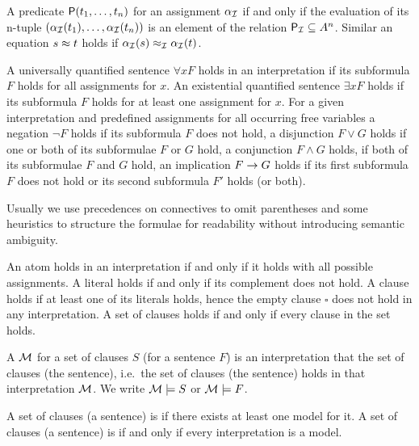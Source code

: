 \begin{definition}\label{def:semantics:atoms}
	A predicate \( \mathsf{P}(t_1,\ldots,t_n) \)
	 for an assignment \( \alpha_{\mathcal{I}} \)
	if and only if the evaluation of its n-tuple \(
	(\alpha_{\mathcal{I}}({t_1}),\ldots,\alpha_{\mathcal{I}}({t_n})) \)
	is an element of the relation \( \mathsf{P}_{\mathcal{I}}\subseteq A^n \).
	Similar an equation \( s\approx t \)
	holds if \( \alpha_{\mathcal{I}}(s) \approx_{\mathcal{I}} \alpha_{\mathcal{I}}(t) \).
\end{definition}

\begin{definition}
	\label{def:semantics:FOF}
	A universally quantified sentence \( \forall x F \)
	holds in an interpretation if its subformula \( F \) holds for all assignments for \( x \).
	An existential quantified sentence \( \exists xF \) holds if its subformula \( F \) holds for at least one assignment for \( x \).
	For a given interpretation and predefined assignments for all occurring free variables
	a negation \( \lnot F \) holds if its subformula \( F \) does not hold,
	a disjunction \( F\lor G \) holds if one or both of its subformulae \( F \) or \( G \) hold,
	a conjunction \( F\land G \) holds, if both of its subformulae \( F \) and \( G \) hold,
	an implication \( F\rightarrow G \) holds if its first subformula \( F \) does not hold or its second subformula \( F' \) holds (or both).

	\begin{remark}Usually we use precedences on connectives to omit parentheses
		and some heuristics to structure the formulae for readability
		without introducing semantic ambiguity.
	\end{remark}
\end{definition}

\begin{definition}\label{def:semantics:CNF}
	An atom holds in an interpretation if and only if it
	holds with all possible assignments.
	A literal holds if and only if its complement does not hold.
	A clause holds if at least one of its literals holds,
	hence the empty clause \( \square \) does not hold in any interpretation.
	A set of clauses holds if and only if every clause in the set holds.
\end{definition}

\begin{definition}
	A  \( \mathcal{M} \) for a set of clauses \( S \) (for a sentence \( F \))
	is an interpretation that
	 the set of clauses (the sentence),
	i.e.~the set of clauses (the sentence) holds in that interpretation \( \mathcal{M} \).
	We write \( \mathcal{M}\models S \) or \( \mathcal{M}\models F \).

	A set of clauses (a sentence) is  if there exists at least one model for it.
	A set of clauses (a sentence) is  if and only if every interpretation is a model.
\end{definition}

